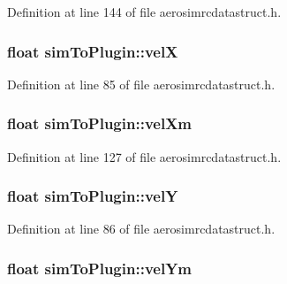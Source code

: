 \-Definition at line 144 of file aerosimrcdatastruct.\-h.

\hypertarget{group___aero_sim_r_c_gad7b2d0364e0e774256fc64c187a8c336}{
\subsubsection[{vel\-X}]{\setlength{\rightskip}{0pt plus 5cm}float {\bf sim\-To\-Plugin\-::vel\-X}}}\label{group___aero_sim_r_c_gad7b2d0364e0e774256fc64c187a8c336}


\-Definition at line 85 of file aerosimrcdatastruct.\-h.

\hypertarget{group___aero_sim_r_c_ga5b8ca52e6b6fcba33660c4164ff14b21}{
\subsubsection[{vel\-Xm}]{\setlength{\rightskip}{0pt plus 5cm}float {\bf sim\-To\-Plugin\-::vel\-Xm}}}\label{group___aero_sim_r_c_ga5b8ca52e6b6fcba33660c4164ff14b21}


\-Definition at line 127 of file aerosimrcdatastruct.\-h.

\hypertarget{group___aero_sim_r_c_gae4f260f3786184d15cd8f674860f8866}{
\subsubsection[{vel\-Y}]{\setlength{\rightskip}{0pt plus 5cm}float {\bf sim\-To\-Plugin\-::vel\-Y}}}\label{group___aero_sim_r_c_gae4f260f3786184d15cd8f674860f8866}


\-Definition at line 86 of file aerosimrcdatastruct.\-h.

\hypertarget{group___aero_sim_r_c_ga78ba6a4d5b2134bed1c2396ff9212df0}{
\subsubsection[{vel\-Ym}]{\setlength{\rightskip}{0pt plus 5cm}float {\bf sim\-To\-Plugin\-::vel\-Ym}}}\label{group___aero_sim_r_c_ga78ba6a4d5b2134bed1c2396ff9212df0}


